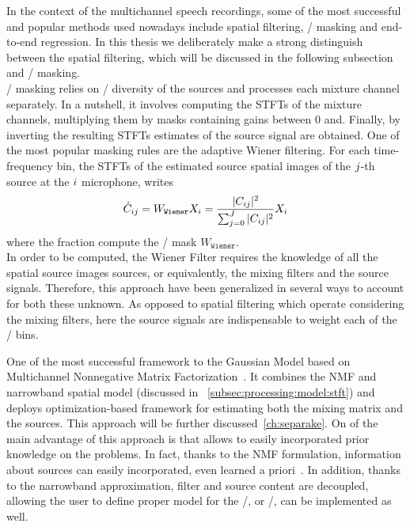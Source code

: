 \mynewline
In the context of the multichannel speech recordings, some of the most successful and popular methods used nowadays
include spatial filtering, \TF/ masking and end-to-end regression.
In this thesis we deliberately make a strong distinguish between the spatial filtering, which will be discussed in the following subsection and \TF/ masking.
\\\TF/ masking relies on \TF/ diversity of the sources and processes each mixture channel separately.
In a nutshell, it involves computing the \acp{STFT} of the mixture channels, multiplying them by masks containing gains between 0 and.
Finally, by inverting the resulting \acp{STFT} estimates of the source signal are obtained.
One of the most popular masking rules are the adaptive Wiener filtering.
For each time-frequency bin, the \acp{STFT} of the estimated source spatial images of the $j$-th source at the $i$ microphone, writes
\begin{equation}
    \hat{C}_{ij} = W_\texttt{Wiener} X_{i} = \frac{|{C_{ij}}|^2}{\sum_{j=0}^{J} |{C_{ij}}|^2} X_{i}
\end{equation}
where the fraction compute the \TF/ mask $W_\texttt{Wiener}$.
\\In order to be computed, the Wiener Filter requires the knowledge of all the spatial source images sources, or equivalently, the mixing filters and the source signals.
Therefore,  this approach have been generalized in several ways to account for both these unknown.
As opposed to spatial filtering which operate considering the mixing filters, here the source signals are indispensable to weight each of the \TF/ bins.


\mynewline
One of the most successful framework to the Gaussian Model based on Multichannel Nonnegative Matrix Factorization~.
It combines the \acf{NMF} and narrowband spatial model (discussed in ~\cref{subsec:processing:model:stft}) and deploys optimization-based framework for estimating both the mixing matrix and the sources.
This approach will be further discussed~\cref{ch:separake}.
On of the main advantage of this approach is that allows to easily incorporated prior knowledge on the problems.
In fact, thanks to the \ac{NMF} formulation, information about sources can easily incorporated, even learned a priori~.
In addition, thanks to the narrowband approximation, filter and source content are decoupled, allowing the user to define proper model for the \RIRs/, or \ReTFs/, can be implemented as well.

